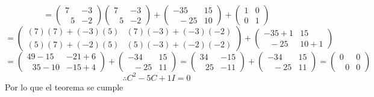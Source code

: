 \begin{itemize}
    $$=\begin{pmatrix}7&-3\\ \:\:\:5&-2\end{pmatrix}\begin{pmatrix}7&-3\\ \:\:\:5&-2\end{pmatrix}+\begin{pmatrix}-35&15\\ \:\:\:-25&10\end{pmatrix}+\begin{pmatrix}1&0\\0&1\end{pmatrix}$$
    $$=\begin{pmatrix}(7)(7)+(-3)(5)&(7)(-3)+(-3)(-2)\\ (5)(7)+(-2)(5)&(5)(-3)+(-2)(-2)\end{pmatrix}+\begin{pmatrix}-35+1&15\\ \:\:\:-25&10+1\end{pmatrix}$$
    $$=\begin{pmatrix}49-15&-21+6\\ \:\:\ 35-10&-15+4\end{pmatrix}+\begin{pmatrix}-34&15\\ \:\:\:-25&11\end{pmatrix}=\begin{pmatrix}34&-15\\ \:\:\ 25&-11\end{pmatrix}+\begin{pmatrix}-34&15\\ \:\:\:-25&11\end{pmatrix}=\begin{pmatrix}0&0\\ \:\:\:0&0\end{pmatrix}$$
    $$\therefore C^2-5C+1I=0$$
    Por lo que el teorema se cumple
    

\end{itemize}
